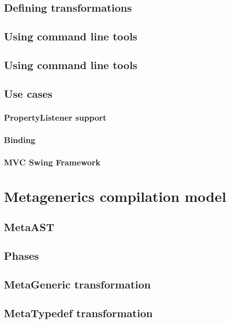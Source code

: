 \subsection{Defining transformations}
\subsection{Using command line tools}
\subsection{Using command line tools}
\subsection{Use cases}
\subsubsection{PropertyListener support}
\subsubsection{Binding}
\subsubsection{MVC Swing Framework}

\section{Metagenerics compilation model}
\subsection{MetaAST}
\subsection{Phases}
\subsection{MetaGeneric transformation}
\subsection{MetaTypedef transformation}